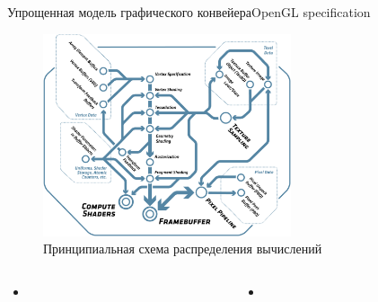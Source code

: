 \documentclass{beamer}
\begin{document}
\begin{frame}{Упрощенная модель графического конвейера}{OpenGL specification}
	\begin{figure} 
		\includegraphics[width=0.65\textwidth]{images/OpenGL_specification_graphics_pipeline.png}
		\caption {Принципиальная схема распределения вычислений}
	\end{figure}
\end{frame}

\begin{columns}
	
	\begin{column}{0.5\textwidth}
		\begin{itemize}
			\item
			
		\end{itemize}
	\end{column}
	\begin{column}{0.5\textwidth}
		\begin{itemize}
			\item
		\end{itemize}
	\end{column}
	
\end{columns}
\fi
	
\end{document}
